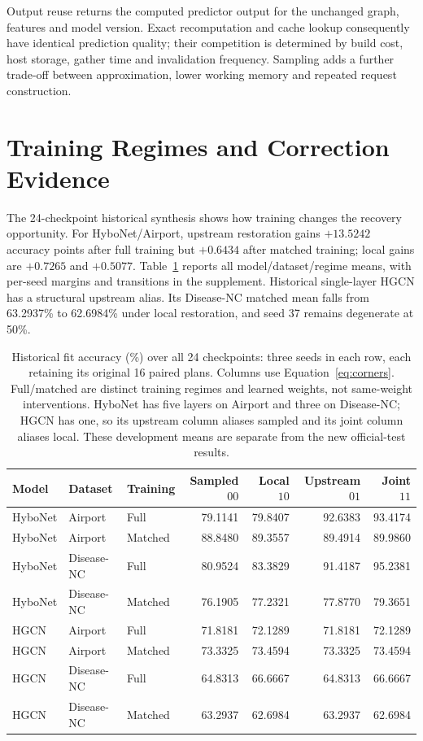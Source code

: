\documentclass[sigconf, nonacm]{acmart}
\begin{document}
\FinalCacheFigure

Output reuse returns the computed predictor output for the unchanged graph, features and model version. Exact recomputation and cache lookup consequently have identical prediction quality; their competition is determined by build cost, host storage, gather time and invalidation frequency. Sampling adds a further trade-off between approximation, lower working memory and repeated request construction.

\section{Training Regimes and Correction Evidence}
\label{sec:historical-results}
The 24-checkpoint historical synthesis shows how training changes the recovery opportunity. For HyboNet/Airport, upstream restoration gains $+13.5242$ accuracy points after full training but $+0.6434$ after matched training; local gains are $+0.7265$ and $+0.5077$. Table~\ref{tab:historical-corners} reports all model/dataset/regime means, with per-seed margins and transitions in the supplement. Historical single-layer HGCN has a structural upstream alias. Its Disease-NC matched mean falls from 63.2937\% to 62.6984\% under local restoration, and seed 37 remains degenerate at 50\%.

\begin{table}[tp]
\centering\small
\caption{Historical fit accuracy (\%) over all 24 checkpoints: three seeds in each row, each retaining its original 16 paired plans. Columns use Equation~\eqref{eq:corners}. Full/matched are distinct training regimes and learned weights, not same-weight interventions. HyboNet has five layers on Airport and three on Disease-NC; HGCN has one, so its upstream column aliases sampled and its joint column aliases local. These development means are separate from the new official-test results.}
\label{tab:historical-corners}
\begin{tabular}{lllrrrr}
\toprule
Model & Dataset & Training & Sampled $00$ & Local $10$ & Upstream $01$ & Joint $11$\\
\midrule
HyboNet & Airport & Full & 79.1141 & 79.8407 & 92.6383 & 93.4174\\
HyboNet & Airport & Matched & 88.8480 & 89.3557 & 89.4914 & 89.9860\\
HyboNet & Disease-NC & Full & 80.9524 & 83.3829 & 91.4187 & 95.2381\\
HyboNet & Disease-NC & Matched & 76.1905 & 77.2321 & 77.8770 & 79.3651\\
HGCN & Airport & Full & 71.8181 & 72.1289 & 71.8181 & 72.1289\\
HGCN & Airport & Matched & 73.3325 & 73.4594 & 73.3325 & 73.4594\\
HGCN & Disease-NC & Full & 64.8313 & 66.6667 & 64.8313 & 66.6667\\
HGCN & Disease-NC & Matched & 63.2937 & 62.6984 & 63.2937 & 62.6984\\
\bottomrule
\end{tabular}
\end{table}
\end{document}
